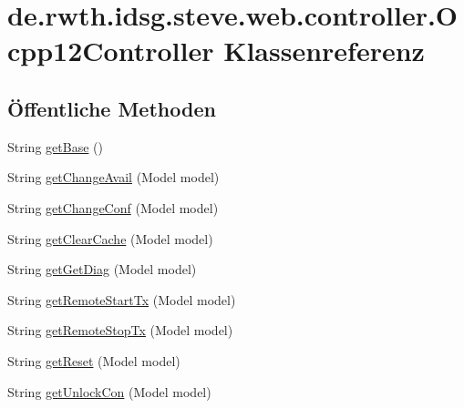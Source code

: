 \hypertarget{classde_1_1rwth_1_1idsg_1_1steve_1_1web_1_1controller_1_1_ocpp12_controller}{\section{de.\-rwth.\-idsg.\-steve.\-web.\-controller.\-Ocpp12\-Controller Klassenreferenz}
\label{classde_1_1rwth_1_1idsg_1_1steve_1_1web_1_1controller_1_1_ocpp12_controller}
}
\subsection*{Öffentliche Methoden}
\begin{DoxyCompactItemize}
\item 
String \hyperlink{classde_1_1rwth_1_1idsg_1_1steve_1_1web_1_1controller_1_1_ocpp12_controller_abe6138beca31ed10e1fb11f0f41a14ad}{get\-Base} ()
\item 
String \hyperlink{classde_1_1rwth_1_1idsg_1_1steve_1_1web_1_1controller_1_1_ocpp12_controller_a06d96c93d21babbba4823d050fb9f6ba}{get\-Change\-Avail} (Model model)
\item 
String \hyperlink{classde_1_1rwth_1_1idsg_1_1steve_1_1web_1_1controller_1_1_ocpp12_controller_a4ffa5ecac9d1dadd11842a4e2c42284a}{get\-Change\-Conf} (Model model)
\item 
String \hyperlink{classde_1_1rwth_1_1idsg_1_1steve_1_1web_1_1controller_1_1_ocpp12_controller_a481e9e93efab0dc912ef86028bc8caf1}{get\-Clear\-Cache} (Model model)
\item 
String \hyperlink{classde_1_1rwth_1_1idsg_1_1steve_1_1web_1_1controller_1_1_ocpp12_controller_a850543e82e9a25f5ba68fda1c0dcfa78}{get\-Get\-Diag} (Model model)
\item 
String \hyperlink{classde_1_1rwth_1_1idsg_1_1steve_1_1web_1_1controller_1_1_ocpp12_controller_af7b7c14f81fdf6b75779391208167299}{get\-Remote\-Start\-Tx} (Model model)
\item 
String \hyperlink{classde_1_1rwth_1_1idsg_1_1steve_1_1web_1_1controller_1_1_ocpp12_controller_a9b77a6f53aa6dee4c6f290d6f3491b31}{get\-Remote\-Stop\-Tx} (Model model)
\item 
String \hyperlink{classde_1_1rwth_1_1idsg_1_1steve_1_1web_1_1controller_1_1_ocpp12_controller_a6e82470115742fbac1f8e589561f11d1}{get\-Reset} (Model model)
\item 
String \hyperlink{classde_1_1rwth_1_1idsg_1_1steve_1_1web_1_1controller_1_1_ocpp12_controller_ab81929407df92e5d3e417d76c5c11c7e}{get\-Unlock\-Con} (Model model)

\end{DoxyCompactItemize}

